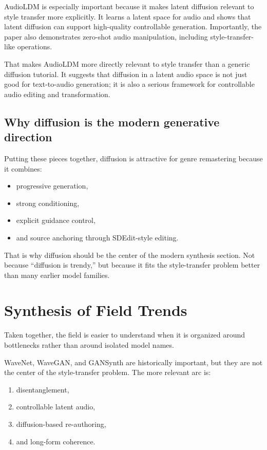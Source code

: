 \documentclass[11pt]{article}
\begin{document}
AudioLDM is especially important because it makes latent diffusion relevant to style transfer more explicitly. It learns a latent space for audio and shows that latent diffusion can support high-quality controllable generation. Importantly, the paper also demonstrates zero-shot audio manipulation, including style-transfer-like operations.

That makes AudioLDM more directly relevant to style transfer than a generic diffusion tutorial. It suggests that diffusion in a latent audio space is not just good for text-to-audio generation; it is also a serious framework for controllable audio editing and transformation.

\subsection{Why diffusion is the modern generative direction}

Putting these pieces together, diffusion is attractive for genre remastering because it combines:

\begin{itemize}
\item progressive generation,
\item strong conditioning,
\item explicit guidance control,
\item and source anchoring through SDEdit-style editing.
\end{itemize}

That is why diffusion should be the center of the modern synthesis section. Not because ``diffusion is trendy,'' but because it fits the style-transfer problem better than many earlier model families.

\section{Synthesis of Field Trends}

Taken together, the field is easier to understand when it is organized around bottlenecks rather than around isolated model names.

WaveNet, WaveGAN, and GANSynth are historically important, but they are not the center of the style-transfer problem. The more relevant arc is:

\begin{enumerate}
\item disentanglement,
\item controllable latent audio,
\item diffusion-based re-authoring,
\item and long-form coherence.
\end{enumerate}
\end{document}
